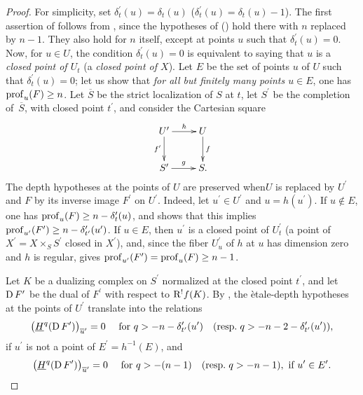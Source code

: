 \begin{proof}
For simplicity, set $\delta_{t}^{\prime}(u)=\delta_{t}(u)$ (\resp $\delta_{t}^{\prime}(u)=\delta_{t}(u)-1$). The first assertion of  follows from , since the hypotheses of  (\resp {}) hold there with $n$ replaced by $n-1$. They also hold for $n$ itself, except at points $u$ such that $\delta_{t}^{\prime}(u)=0$. Now, for $u\in U$, the condition $\delta_{t}^{\prime}(u)=0$ is equivalent to saying that $u$ is a \emph{closed point of $U_t$} (\resp a \emph{closed point of $X$}). Let $E$ be the set of points $u$ of $U$ such that $\delta_{t}^{\prime}(u)=0$; let us show that \emph{for all but finitely many points $u\in E$}, one has $\operatorname{prof}_{u}(F)\geq n$. Let $\overline{S}$ be the strict localization of $S$ at $t$, let $S^{\prime}$ be the completion of~$\overline{S}$, with closed point $t^{\prime}$, and consider the Cartesian square
$$
\xymatrix{ U^{\prime}\ar[r]^-{h}\ar[d]_-{f^{\prime}} & U\ar[d]^-{f}\\
S^{\prime}\ar[r]^-{g} & S.}$$
The depth hypotheses at the points of $U$ are preserved when\pageoriginale $U$ is replaced by $U^{\prime}$ and $F$ by its inverse image $F^{\prime}$ on $U^{\prime}$. Indeed, let $u^{\prime}\in U^{\prime}$ and $u=h(u^{\prime})$. If $u\not\in E$, one has $\operatorname{prof}_{u}(F)\geq n-\delta_{t}^{\prime}(u)$, and  shows that this implies $\operatorname{prof}_{u^{\prime}}(F^{\prime})\geq n-\delta_{t^{\prime}}^{\prime}(u^{\prime})$. If $u\in E$, then $u^{\prime}$ is a closed point of $U_{t}^{\prime}$ (\resp a point of $X^{\prime}=X\times_{S}S^{\prime}$ closed in $X^{\prime}$), and, since the fiber $U_{u}^{\prime}$ of $h$ at $u$ has dimension zero and $h$ is regular,  gives $\operatorname{prof}_{u^{\prime}}(F^{\prime})=\operatorname{prof}_{u}(F)\geq n-1$.

Let $K$ be a dualizing complex on $S^{\prime}$ normalized at the closed point $t^{\prime}$, and let $\operatorname{D} F^{\prime}$ be the dual of $F^{\prime}$ with respect to $\mathrm R^{!}f(K)$. By , the \`etale-depth hypotheses at the points of $U^{\prime}$ translate into the relations
$$
\big(\underline{H}^{q}(\operatorname{D} F^{\prime})\big)_{\overline{u}^{\prime}}=0\quad\textrm{ for }q>-n-\delta_{t^{\prime}}^{\prime}(u^{\prime})\quad(\textrm{resp.\kern.3em}q>-n-2-\delta_{t^{\prime}}^{\prime}(u^{\prime})),
$$
if $u^{\prime}$ is not a point of $E^{\prime}=h^{-1}(E)$, and
$$
\big(\underline{H}^{q}(\operatorname{D} F^{\prime})\big)_{\overline{u}^{\prime}}=0\quad\textrm{ for }q>-(n-1)\quad(\textrm{resp.\kern.3em}q>-n-1), \textrm{ if }u^{\prime}\in E^{\prime}.
$$


\end{proof}
